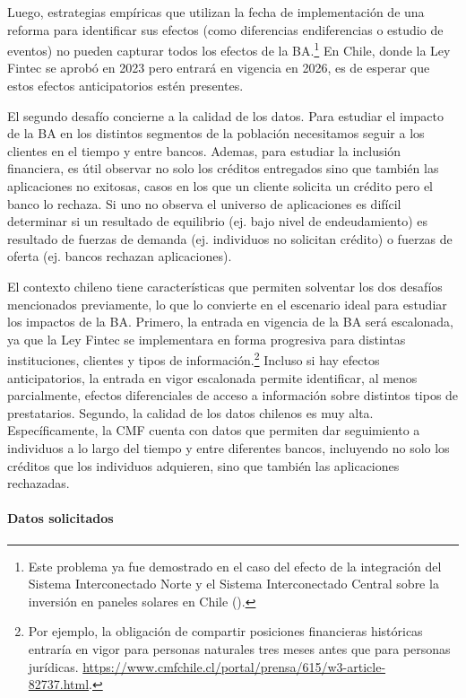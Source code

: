 \documentclass[11pt]{article}
\theoremstyle{plain}
\theoremstyle{plain}
\begin{document}
Luego, estrategias empíricas que utilizan la fecha de implementación de una reforma para identificar sus efectos (como diferencias endiferencias o estudio de eventos) no pueden capturar todos los efectos de la BA.\footnote{Este problema ya fue demostrado en el caso del efecto de la integración del Sistema Interconectado Norte y el Sistema Interconectado Central sobre la inversión en paneles solares en Chile (\cite{gonzales_investment_2023}).} En Chile, donde la Ley Fintec se aprobó en 2023 pero entrará en vigencia en 2026, es de esperar que estos efectos anticipatorios estén presentes.

El segundo desafío concierne a la calidad de los datos. Para estudiar el impacto de la BA en los distintos segmentos de la población necesitamos seguir a los clientes en el tiempo y entre bancos. Ademas, para estudiar la inclusión financiera, es útil observar no solo los créditos entregados sino que también las aplicaciones no exitosas, casos en los que un cliente solicita un crédito pero el banco lo rechaza. Si uno no observa el universo de aplicaciones es difícil determinar si un resultado de equilibrio (ej. bajo nivel de endeudamiento) es resultado de fuerzas de demanda (ej. individuos no solicitan crédito) o fuerzas de oferta (ej. bancos rechazan aplicaciones).  

El contexto chileno tiene características que permiten solventar los dos desafíos mencionados previamente, lo que lo convierte en el escenario ideal para estudiar los impactos de la BA. 
Primero, la entrada en vigencia de la BA será escalonada, ya que la Ley Fintec se implementara en forma progresiva para  distintas instituciones, clientes y tipos de información.\footnote{Por ejemplo, la obligación de compartir posiciones financieras históricas entraría en vigor para personas naturales tres meses antes que para personas jurídicas. \url{https://www.cmfchile.cl/portal/prensa/615/w3-article-82737.html}.} Incluso si hay efectos anticipatorios, la entrada en vigor escalonada permite identificar, al menos parcialmente, efectos diferenciales de acceso a información sobre distintos tipos de prestatarios. Segundo, la calidad de los datos chilenos es muy alta. Específicamente, la CMF cuenta con datos que permiten dar seguimiento a individuos a lo largo del tiempo y entre diferentes bancos, incluyendo no solo los créditos que los individuos adquieren, sino que también las aplicaciones rechazadas. 


 

\paragraph{Datos solicitados}
\end{document}
